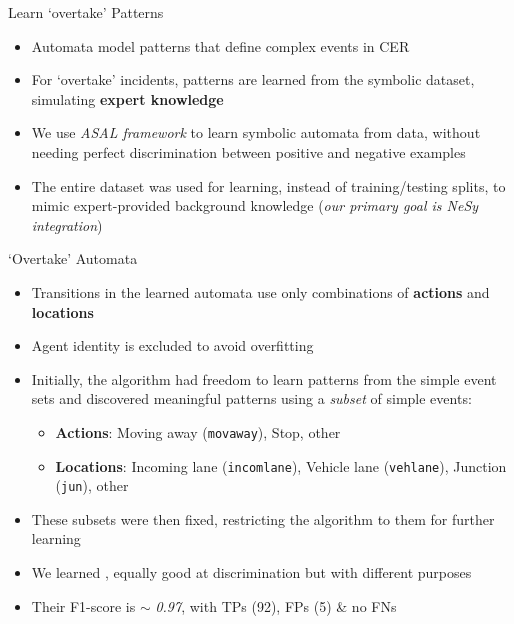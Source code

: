 \documentclass[10pt, aspectratio=169]{beamer}
\begin{document}
\begin{frame}{Learn `overtake' Patterns}
    \begin{itemize}
        \setlength{\itemsep}{13pt}
        \item Automata model patterns that define complex events in CER
        \item For `overtake' incidents, patterns are learned from the symbolic dataset, simulating \textbf{expert knowledge}
        \item We use \textit{ASAL framework} to learn symbolic automata from data, without needing perfect discrimination between positive and negative examples
        \item The \textcolor{umBlueLighter}{entire dataset} was used for learning, instead of training/testing splits, to mimic expert-provided background knowledge (\textit{our primary goal is NeSy integration})
    \end{itemize}
\end{frame}

\begin{frame}{`Overtake' Automata}
    \begin{itemize}
    \setlength{\itemsep}{10pt}
    \item Transitions in the learned automata use only combinations of \textbf{actions} and \textbf{locations}
    \item Agent identity is excluded to avoid overfitting
    \item Initially, the algorithm had freedom to learn patterns from the simple event sets and discovered meaningful patterns using a \textit{subset} of simple events:
    \vspace{5pt}
    \begin{itemize}
        \setlength{\itemsep}{3pt}
        \item \textbf{Actions}: Moving away (\texttt{movaway}), Stop, other
        \item \textbf{Locations}: Incoming lane (\texttt{incomlane}), Vehicle lane (\texttt{vehlane}), Junction (\texttt{jun}), other
    \end{itemize}
    \item These subsets were then fixed, restricting the algorithm to them for further learning
    \item We learned , equally good at discrimination but with different purposes
    \item Their F1-score is $\sim$ \textit{0.97}, with TPs (92), FPs (5) \& no FNs
\end{itemize}
\end{frame}
\end{document}
